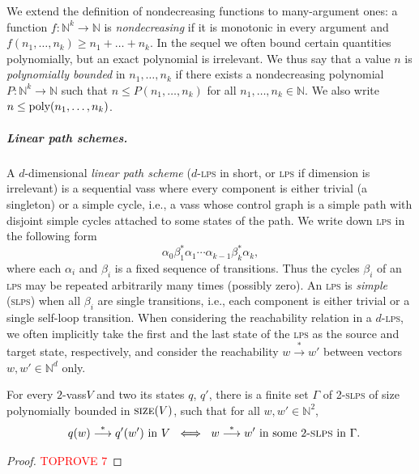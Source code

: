 \documentclass[a4paper, UKenglish, cleveref, autoref, thm-restate]{lipics-v2021}
\newcommand{\N}{\mathbb{N}}
\newcommand{\trans}[1]{\stackrel{#1}{\longrightarrow}}
\newcommand{\tran}{\trans{*}}
\newcommand{\slps}{\textsc{slps}\xspace}
\newcommand{\size}{\textsc{size}}
\newcommand{\poly}{\textup{poly}}
\newcommand{\LPS}{\lps}
\newcommand{\SLPS}{\slps}
\newcommand{\vass}{{\sc vass}\xspace}
\newcommand{\lps}{\textsc{lps}\xspace}
\newcommand{\dslps}{2-\slps}
\newcommand{\dvass}{\parvass 2}
\newcommand{\parvass}[1]{{$#1$-\vass}\xspace}
\newcommand{\para}[1]{\vspace{-3mm}\subparagraph*{\bf #1.}}
\begin{document}
\begin{appendixproof}
We extend the definition of nondecreasing functions to many-argument ones:
a function $f: \N^k \to \N$ is \emph{nondecreasing} if it is monotonic
in every argument and $f(n_1, \ldots, n_k) \geq n_1 + \ldots + n_k$.
In the sequel we often bound certain quantities polynomially, but an exact polynomial is irrelevant. 
We thus say that a value $n$ is \emph{polynomially bounded} in $n_1, \ldots, n_k$
if there exists a nondecreasing polynomial $P: \N^k \to \N$ such that $n \leq P(n_1, \ldots, n_k)$
for all $n_1, \ldots, n_k \in \N$. 
We also write $n \leq \poly(n_1, \ldots, n_k)$.

\para{Linear path schemes}
A $d$-dimensional \emph{linear path scheme} ($d$-\LPS in short, or \LPS if dimension is irrelevant) 
is a sequential \vass where every component is either trivial (a singleton) or a simple cycle,
i.e., a \vass whose control graph is a simple path with disjoint simple cycles attached to some states of the path.
We write down \LPS in the following form 
\[
\alpha_0\beta_1^* \alpha_1 \cdots \alpha_{k-1} \beta_{k}^* \alpha_k,
\]
where each $\alpha_i$ and $\beta_i$ is  a fixed sequence of transitions. 
Thus the cycles $\beta_i$ of an \lps may be repeated arbitrarily many times (possibly zero). 
An \LPS is \emph{simple} (\SLPS) when all $\beta_i$ are single transitions, i.e.,
each component is either trivial or a single self-loop transition.
When considering the reachability relation in a $d$-\LPS, we often implicitly take the first and the last state
of the \LPS as the source and target state, respectively, and consider the reachability $w\tran w'$ between
vectors $w,w'\in\N^d$ only.






\begin{lemma}\label{lem:two-slps}
For every \dvass $V$ and two its states $q$, $q'$,
there is a finite set $\Gamma$ of \dslps of size polynomially bounded in $\size(V)$,
such that for all $w,w'\in\N^2$,
\begin{align*} \ \ q(w) \tran q'(w') \text{ in } V \ \iff \ w \tran w' \text{ in some  \dslps in } \Gamma.
\end{align*}
\end{lemma}

\begin{proof}\textcolor{red}{TOPROVE 7}\end{proof}










\end{appendixproof}
\end{document}
